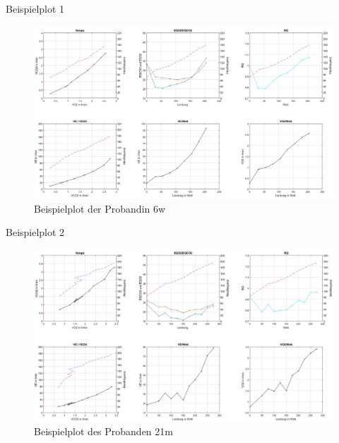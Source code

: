 \documentclass[colorBG,slideColor,8pt]{beamer}
\begin{document}
\begin{frame}{Beispielplot 1}
	\begin{figure}[H]
		\centering
			\includegraphics[width=0.85\linewidth]{Bilder/plot_6w.jpg}
			\caption{Beispielplot der Probandin 6w}
	\end{figure}
\end{frame}

\begin{frame}{Beispielplot 2}
	\begin{figure}[H]
		\centering
			\includegraphics[width=0.85\linewidth]{Bilder/plot_21m.jpg}
			\caption{Beispielplot des Probanden 21m}
	\end{figure}
\end{frame}
\end{document}
